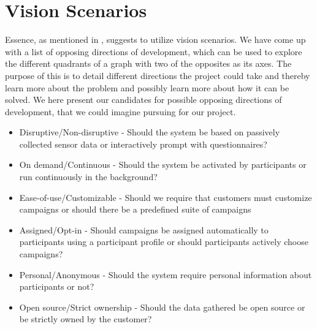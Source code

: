 \section{Vision Scenarios}
\label{sec:vision_scenarios}

Essence, as mentioned in , suggests to utilize vision scenarios. We have come up with a list of opposing directions of development, which can be used to explore the different quadrants of a graph with two of the opposites as its axes. The purpose of this is to detail different directions the project could take and thereby learn more about the problem and possibly learn more about how it can be solved. We here present our candidates for possible opposing directions of development, that we could imagine pursuing for our project.

\begin{itemize}
	\setlength\itemsep{-0.2em}
    \item Disruptive/Non-disruptive - Should the system be based on passively collected sensor data or interactively prompt with questionnaires? %
    \item On demand/Continuous - Should the system be activated by participants or run continuously in the background? %
    \item Ease-of-use/Customizable - Should we require that customers must customize campaigns or should there be a predefined suite of campaigns %
    \item Assigned/Opt-in - Should campaigns be assigned automatically to participants using a participant profile or should participants actively choose campaigns? %
    \item Personal/Anonymous - Should the system require personal information about participants or not? %
    \item Open source/Strict ownership - Should the data gathered be open source or be strictly owned by the customer? %
\end{itemize}

